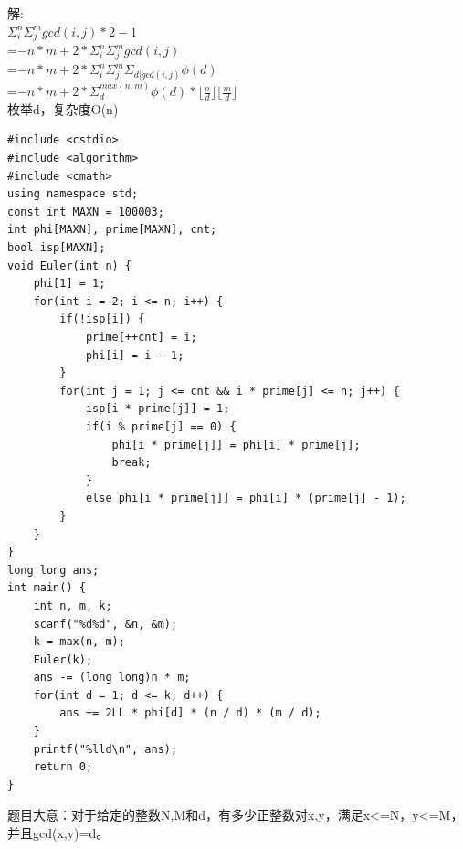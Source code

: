 \documentclass[10pt]{ctexart}
\begin{document}
{解:\\
$\Sigma_i^n\Sigma_j^mgcd(i, j) * 2 - 1$\\
=$- n * m + 2 * \Sigma_i^n\Sigma_j^mgcd(i, j) $\\
=$- n * m + 2 * \Sigma_i^n\Sigma_j^m\Sigma_{d|gcd(i, j)} \phi(d) $\\
=$-n * m + 2 * \Sigma_d^{max(n, m)}\phi(d) * \lfloor\frac{n}{d}\rfloor\lfloor\frac{m}{d}\rfloor $\\枚举d，复杂度O(n)
\begin{lstlisting}
#include <cstdio>
#include <algorithm>
#include <cmath>
using namespace std;
const int MAXN = 100003;
int phi[MAXN], prime[MAXN], cnt;
bool isp[MAXN];
void Euler(int n) {
    phi[1] = 1;
    for(int i = 2; i <= n; i++) {
        if(!isp[i]) {
            prime[++cnt] = i;
            phi[i] = i - 1;
        }
        for(int j = 1; j <= cnt && i * prime[j] <= n; j++) {
            isp[i * prime[j]] = 1;
            if(i % prime[j] == 0) {
                phi[i * prime[j]] = phi[i] * prime[j];
                break;
            }
            else phi[i * prime[j]] = phi[i] * (prime[j] - 1);
        }
    }
}
long long ans;
int main() {
    int n, m, k;
    scanf("%d%d", &n, &m);
    k = max(n, m);
    Euler(k);
    ans -= (long long)n * m;
    for(int d = 1; d <= k; d++) {
        ans += 2LL * phi[d] * (n / d) * (m / d);
    }
    printf("%lld\n", ans);
    return 0;
}
\end{lstlisting}

题目大意：对于给定的整数N,M和d，有多少正整数对x,y，满足x<=N，y<=M，并且gcd(x,y)=d。\\

}
\end{document}
